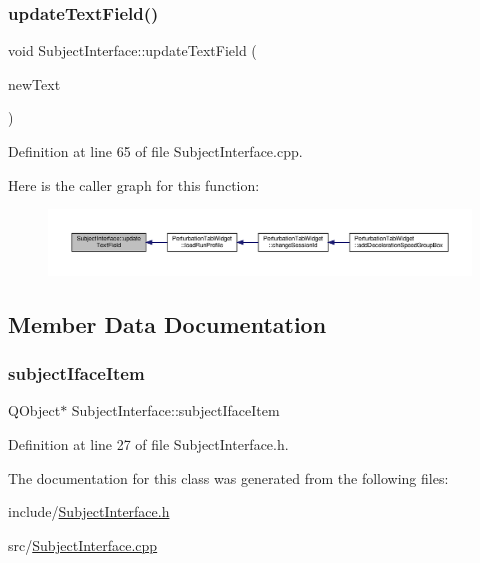 \subsubsection{\texorpdfstring{update\+Text\+Field()}{updateTextField()}}
{\footnotesize\ttfamily void Subject\+Interface\+::update\+Text\+Field (\begin{DoxyParamCaption}\item[{Q\+String}]{new\+Text }\end{DoxyParamCaption})}



Definition at line 65 of file Subject\+Interface.\+cpp.

Here is the caller graph for this function\+:
\nopagebreak
\begin{figure}[H]
\begin{center}
\leavevmode
\includegraphics[width=350pt]{class_subject_interface_ab843d4b0a55c2a0126f4406db1e93069_icgraph}
\end{center}
\end{figure}


\subsection{Member Data Documentation}
\mbox{\label{class_subject_interface_afa214a1816549b7cbcdd28023cd0b308}} 
\subsubsection{\texorpdfstring{subject\+Iface\+Item}{subjectIfaceItem}}
{\footnotesize\ttfamily Q\+Object$\ast$ Subject\+Interface\+::subject\+Iface\+Item}



Definition at line 27 of file Subject\+Interface.\+h.



The documentation for this class was generated from the following files\+:\begin{DoxyCompactItemize}
\item 
include/\hyperlink{_subject_interface_8h}{Subject\+Interface.\+h}\item 
src/\hyperlink{_subject_interface_8cpp}{Subject\+Interface.\+cpp}\end{DoxyCompactItemize}
